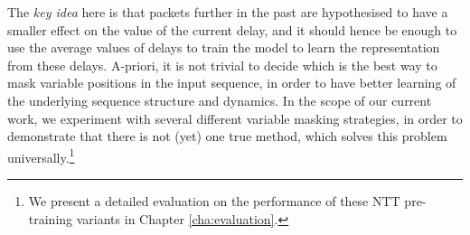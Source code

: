 The \emph{key idea} here is that packets further in the past are hypothesised to have a smaller effect on the value of the current delay, and it should hence be enough to use the average values of delays to train the model to learn the representation from these delays. A-priori, it is not trivial to decide which is the best way to mask variable positions in the input sequence, in order to have better learning of the underlying sequence structure and dynamics. In the scope of our current work, we experiment with several different variable masking strategies, in order to demonstrate that there is not (yet) one true method, which solves this problem universally.\footnote{We present a detailed evaluation on the performance of these NTT pre-training variants in Chapter \ref{cha:evaluation}.}











